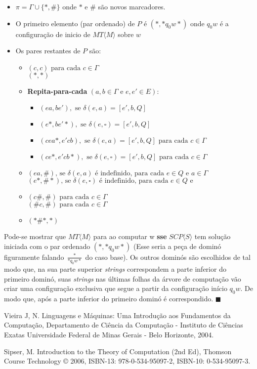 \documentclass[12pt, a4paper]{article}
\begin{document}
\begin{itemize}
\item $\pi = \Gamma \cup \lbrace*, \# \rbrace$ onde $* \text{ e } \#$ são novos marcadores.
\item O primeiro elemento (par ordenado) de $P$ é $(*, *q_{0}w*)$ onde $q_{0}w$ é a configuração de inicio de $MT \langle M \rangle$ sobre $w$
\item Os pares restantes de $P$ são:
  \begin{itemize}
    \item $(c, c) \text{ para cada } c \in \Gamma$ \\
             $(*, *)$
    \item \textbf{Repita-para-cada} $(a, b \in \Gamma \text{ e } e, e' \in E)$:
      \begin{itemize}
        \item $(ea, be'),  \text{ se } \delta(e, a)  = [e', b, Q]$
        \item $(e*, be'*), \text{ se } \delta(e, \square)  = [e', b, Q]$
        \item $(cea*, e'cb), \text{ se } \delta(e, a)  = [e', b, Q] \text{ para cada } c \in \Gamma$
        \item $(ce*, e'cb*), \text{ se } \delta(e, \square)  = [e', b, Q] \text{ para cada } c \in \Gamma$
      \end{itemize}
    \item $(ea, \#) \text{, se } \delta(e, a) \text{ é indefinido, para cada } e \in Q \text{ e } a \in \Gamma$ \\
             $(e*, \#*) \text{, se } \delta(e, \square) \text{ é indefinido, para cada } e \in Q \text{ e }$
    \item $(c\#, \#) \text{ para cada } c \in \Gamma$ \\
             $(\#c, \#) \text{ para cada } c \in \Gamma$
    \item $(*\#*, *)$
  \end{itemize}
\end{itemize}

\qquad Pode-se mostrar que $MT\langle M \rangle$ para ao computar w \textbf{sse} $SCP \langle S \rangle$ tem solução iniciada com o par ordenado $(*, *q_{0}w*)$ (Esse seria a peça de dominó figuramente falando $\frac{*}{*q_{0}w*} $ do caso base). Os outros dominós são escolhidos de tal modo que, na sua parte superior \textit{strings} correspondem a parte inferior do primeiro dominó, suas \textit{strings} nas últimas folhas da árvore de computação vão criar uma configuração exclusiva que segue a partir da configuração início $q_{0}w$. De modo que, após a parte inferior do primeiro dominó é correspondido. $\blacksquare$

\pagebreak
\begin{thebibliography}{9}
 Vieira J, N. Linguagens e Máquinas: Uma Introdução aos Fundamentos da Computação, Departamento de Ciência da Computação - Instituto de Ciências Exatas Universidade Federal de Minas Gerais - Belo Horizonte, 2004.

 Sipser, M. Introduction to the Theory of Computation (2nd Ed), Thomson Course Technology © 2006, ISBN-13: 978-0-534-95097-2, ISBN-10: 0-534-95097-3.
\end{thebibliography}
\end{document}

